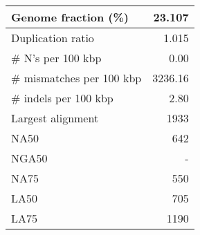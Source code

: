 \documentclass[12pt,a4paper]{article}
\begin{document}
\begin{table}[ht]
\begin{center}
\begin{tabular}{|l*{1}{|r}|}
Genome fraction (\%) & 23.107 \\ \hline
Duplication ratio & 1.015 \\ \hline
\# N's per 100 kbp & 0.00 \\ \hline
\# mismatches per 100 kbp & 3236.16 \\ \hline
\# indels per 100 kbp & 2.80 \\ \hline
Largest alignment & 1933 \\ \hline
NA50 & 642 \\ \hline
NGA50 & - \\ \hline
NA75 & 550 \\ \hline
LA50 & 705 \\ \hline
LA75 & 1190 \\ \hline
\end{tabular}
\end{center}
\end{table}
\end{document}
